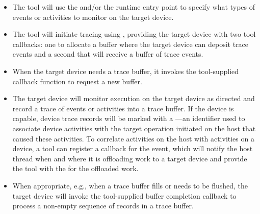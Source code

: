 \begin{itemize}
\item The tool will use the 
  and/or the  runtime entry point to specify what
  types of events or activities to monitor on the target device.
\item The tool will initiate tracing using ,
  providing the target device with two tool callbacks: one to allocate
  a buffer where the target device can deposit trace events and a
  second that will receive a buffer of trace events. 
\item When the target device needs a trace buffer, it invokes the
  tool-supplied callback function to request a new buffer.
\item The target device will monitor execution on the target device as
  directed and record a trace of events or activities into a trace
  buffer. If the device is capable, device trace records will be
  marked with a ---an identifier used to associate
  device activities with the target operation initiated on the host
  that caused these activities.  To correlate activities on the host
  with activities on a device, a tool can register a
  callback for the  event, which
  will notify the host thread when and where it is offloading work to a
  target device and provide the tool with the  for
  the offloaded work.
\item When appropriate, e.g., when a trace buffer fills or needs to be
  flushed, the target device will invoke the tool-supplied buffer
  completion callback to process a non-empty sequence of
  records in a trace buffer. 



\end{itemize}
